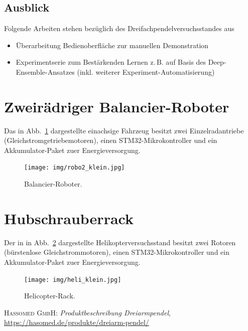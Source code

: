 \documentclass[a4paper,10pt]{scrartcl}
\newcommand{\figref}[1]{Abb.~\ref{#1}}
\begin{document}
\subsection{Ausblick}

Folgende Arbeiten stehen bezüglich des Dreifachpendelversuchsstandes aus

\begin{itemize}
 \item Überarbeitung Bedienoberfläche zur manuellen Demonstration
 \item Experimentserie zum Bestärkenden Lernen z.\,B. auf Basis des Deep-Ensemble-Ansatzes
 (inkl. weiterer Experiment-Automatisierung)
\end{itemize}

    
\newpage

\section{Zweirädriger Balancier-Roboter}    
Das in \figref{fig_robo1} dargestellte einachsige Fahrzeug  besitzt zwei Einzelradantriebe (Gleichstromgetriebemotoren), einen STM32-Mikrokontroller und ein Akkumulator-Paket zuer Energieversorgung.


\begin{figure}[h]
    \begin{center}
    \texttt{[image: img/robo2\_klein.jpg]}
    \end{center}
    \caption{Balancier-Roboter.}
    \label{fig_robo1}
\end{figure}

\newpage
\section{Hubschrauberrack}
Der in in \figref{fig_helirack1} dargestellte Helikopterversuchsstand besitzt zwei Rotoren (bürstenlose Gleichstrommotoren), einen STM32-Mikrokontroller und ein Akkumulator-Paket zuer Energieversorgung.

\begin{figure}[ht]
    \begin{center}
    \texttt{[image: img/heli\_klein.jpg]}
    \end{center}
    \caption{Helicopter-Rack.}
    \label{fig_helirack1}
\end{figure}


\newpage

    
\renewcommand\refname{Referenzen}
\begin{thebibliography}{}
  \textsc{Hassomed GmbH}: \textit{Produktbeschreibung Dreiarmpendel}, \url{https://hasomed.de/produkte/dreiarm-pendel/}


\end{thebibliography}
\end{document}
